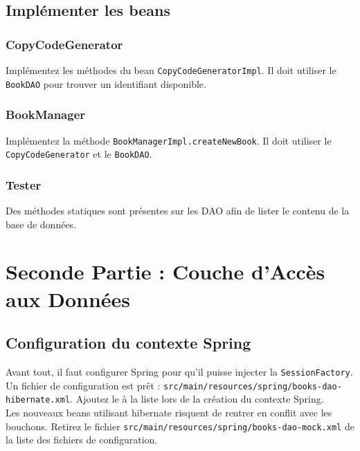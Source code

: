\documentclass[small,algo]{dushClass}
\begin{document}
\subsection{Implémenter les beans}

\subsubsection{CopyCodeGenerator}

Implémentez les méthodes du bean \texttt{CopyCodeGeneratorImpl}. Il doit utiliser le \texttt{BookDAO} pour trouver un identifiant disponible.

\subsubsection{BookManager}
Implémentez la méthode \texttt{BookManagerImpl.createNewBook}. Il doit utiliser le \texttt{CopyCodeGenerator} et le \texttt{BookDAO}.

\subsubsection{Tester}

Des méthodes statiques sont présentes sur les DAO afin de lister le contenu de la base de données.





\section{Seconde Partie : Couche d'Accès aux Données}

\subsection{Configuration du contexte Spring}

Avant tout, il faut configurer Spring pour qu'il puisse injecter la \texttt{SessionFactory}. Un fichier de configuration est prêt : \texttt{src/main/resources/spring/books-dao-hibernate.xml}. Ajoutez le à la liste lors de la création du contexte Spring.\\

Les nouveaux beans utilisant hibernate risquent de rentrer en conflit avec les bouchons. Retirez le fichier \texttt{src/main/resources/spring/books-dao-mock.xml} de la liste des fichiers de configuration.
\end{document}

